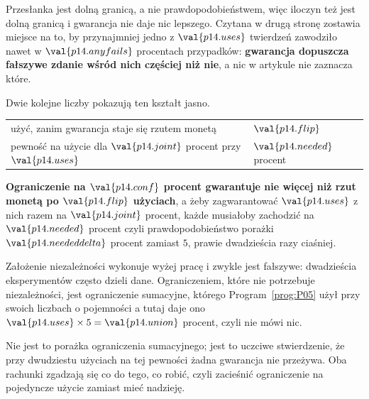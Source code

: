 \begin{fr}
Przesłanka jest dolną granicą, a nie prawdopodobieństwem, więc iloczyn też
jest dolną granicą i gwarancja nie daje nic lepszego. Czytana w drugą stronę
zostawia miejsce na to, by przynajmniej jedno z $\val{p14.uses}$ twierdzeń
zawodziło nawet w $\val{p14.anyfails}$ procentach przypadków: \textbf{gwarancja
dopuszcza fałszywe zdanie wśród nich częściej niż nie}, a nic w artykule nie
zaznacza które.

Dwie kolejne liczby pokazują ten kształt jasno.

\begin{center}
\begin{tabular}{ll}
\toprule
użyć, zanim gwarancja staje się rzutem monetą & $\val{p14.flip}$ \\
pewność na użycie dla $\val{p14.joint}$ procent przy $\val{p14.uses}$
  & $\val{p14.needed}$ procent \\
\bottomrule
\end{tabular}
\end{center}

\textbf{Ograniczenie na $\val{p14.conf}$ procent gwarantuje nie więcej niż
rzut monetą po $\val{p14.flip}$ użyciach}, a żeby zagwarantować
$\val{p14.uses}$ z nich razem na $\val{p14.joint}$ procent, każde musiałoby
zachodzić na $\val{p14.needed}$ procent \dash{} czyli prawdopodobieństwo
porażki $\val{p14.neededdelta}$ procent zamiast $5$, prawie dwadzieścia razy
ciaśniej.

\begin{note}
Założenie niezależności wykonuje wyżej pracę i zwykle jest fałszywe:
dwadzieścia eksperymentów często dzieli dane. Ograniczeniem, które nie
potrzebuje niezależności, jest ograniczenie sumacyjne, którego
Program~\ref{prog:P05} użył przy swoich liczbach o pojemności \dash{} a tutaj
daje ono $\val{p14.uses} \times 5 = \val{p14.union}$ procent, czyli nie mówi
nic.

Nie jest to porażka ograniczenia sumacyjnego; jest to uczciwe stwierdzenie, że
przy dwudziestu użyciach na tej pewności żadna gwarancja nie przeżywa. Oba
rachunki zgadzają się co do tego, co robić, czyli zacieśnić ograniczenie na
pojedyncze użycie zamiast mieć nadzieję.
\end{note}
\end{fr}

